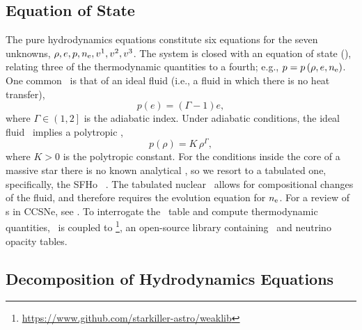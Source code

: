 \subsection{Equation of State}

The pure hydrodynamics equations
constitute six equations for the seven unknowns,
$\rho,e,p,n_{\mathrm{e}},v^{1},v^{2},v^{3}$.
The system is closed with an equation of state (\eos),
relating three of the thermodynamic quantities to a fourth;
e.g., $p=p\left(\rho,e,n_{\mathrm{e}}\right)$.
One common \eos\ is that of an ideal fluid
(i.e., a fluid in which there is no heat transfer),
\begin{equation}
  p\left(e\right)=\left(\Gamma-1\right)e,
\end{equation}
where $\Gamma\in\left(1,2\right]$ is the adiabatic index.
Under adiabatic conditions, the ideal fluid \eos\ implies a polytropic \eos,
\begin{equation}
  p\left(\rho\right)=K\,\rho^{\Gamma},
\end{equation}
where $K>0$ is the polytropic constant.
For the conditions inside the core of a massive star there is no known
analytical \eos, so we resort to a tabulated one,
specifically, the SFHo \eos\ \citep{shf2013}.
The tabulated nuclear \eos\ allows for compositional changes of the
fluid, and therefore requires the evolution equation for $n_{\mathrm{e}}$.
For a review of \eos s in CCSNe, see \citet{ohk2017}.
To interrogate the \eos\ table and compute thermodynamic quantities,
\thornado\ is coupled to \weaklib%
\footnote{\url{https://www.github.com/starkiller-astro/weaklib}},
an open-source library containing \eos\ and neutrino opacity tables.

\subsection{Decomposition of Hydrodynamics Equations}

